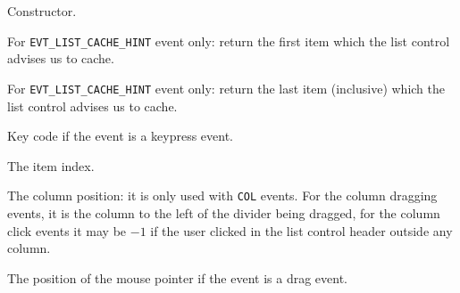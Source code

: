 



\label{wxlisteventctor}


Constructor.


\label{wxlisteventgetcachefrom}


For {\tt EVT\_LIST\_CACHE\_HINT} event only: return the first item which the
list control advises us to cache.


\label{wxlisteventgetcacheto}


For {\tt EVT\_LIST\_CACHE\_HINT} event only: return the last item (inclusive)
which the list control advises us to cache.


\label{wxlisteventgetkeycode}


Key code if the event is a keypress event.


\label{wxlisteventgetindex}


The item index.


\label{wxlisteventgetcolumn}


The column position: it is only used with {\tt COL} events. For the column
dragging events, it is the column to the left of the divider being dragged, for
the column click events it may be $-1$ if the user clicked in the list control
header outside any column.


\label{wxlisteventgetpoint}


The position of the mouse pointer if the event is a drag event.



\label{wxlisteventgetlabel}

